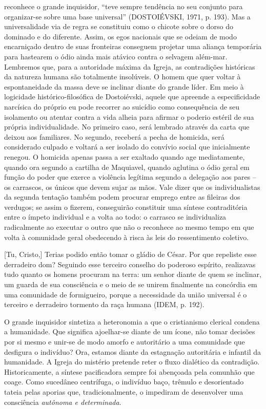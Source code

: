 reconhece o grande inquisidor, ``teve sempre tendência no seu conjunto
para organizar-se sobre uma base universal'' (DOSTOIÉVSKI, 1971, p.
193). Mas a universalidade via de regra se constituiu como o chicote
sobre o dorso do dominado e do diferente. Assim, os egos nacionais que
se odeiam de modo encarniçado dentro de suas fronteiras conseguem
projetar uma aliança temporária para hastearem o ódio ainda mais atávico
contra o selvagem além-mar. Lembremos que, para a autoridade máxima da
Igreja, as contradições históricas da natureza humana são totalmente
insolúveis. O homem que quer voltar à espontaneidade da massa deve se
inclinar diante do grande líder. Em meio à logicidade
histórico-filosófica de Dostoiévski, aquele que apreende a
especificidade narcísica do próprio eu pode recorrer ao suicídio como
consequência de seu isolamento ou atentar contra a vida alheia para
afirmar o poderio estéril de sua própria individualidade. No primeiro
caso, será lembrado através da carta que deixou aos familiares. No
segundo, receberá a pecha de homicida, será considerado culpado e
voltará a ser isolado do convívio social que inicialmente renegou. O
homicida apenas passa a ser exaltado quando age mediatamente, quando ora
segundo a cartilha de Maquiavel, quando aglutina o ódio geral em função
do poder que exerce a violência legítima segundo a delegação aos pares
-- os carrascos, os únicos que devem sujar as mãos. Vale dizer que os
individualistas da segunda tentação também podem procurar emprego entre
as fileiras dos verdugos; se assim o fizerem, conseguirão constituir uma
síntese contraditória entre o ímpeto individual e a volta ao todo: o
carrasco se individualiza radicalmente ao executar o outro que não o
reconhece ao mesmo tempo em que volta à comunidade geral obedecendo à
risca às leis do ressentimento coletivo.

{[}Tu, Cristo,{]} Terias podido então tomar o gládio de César. Por que
repeliste esse derradeiro dom? Seguindo esse terceiro conselho do
poderoso espírito, realizavas tudo quanto os homens procuram na terra:
um senhor diante de quem se inclinar, um guarda de sua consciência e o
meio de se unirem finalmente na concórdia em uma comunidade de
formigueiro, porque a necessidade da união universal é o terceiro e
derradeiro tormento da raça humana (IDEM, p. 192).

O grande inquisidor sintetiza a heteronomia a que o cristianismo
clerical condena a humanidade. Que significa ajoelhar-se diante de um
ícone, não tomar decisões por si mesmo e unir-se de modo amorfo e
autoritário a uma comunidade que desfigura o indivíduo? Ora, estamos
diante da estagnação autoritária e infantil da humanidade. A Igreja do
mistério pretende reter o fluxo dialético da contradição.
Historicamente, a síntese pacificadora sempre foi abençoada pela
comunhão que coage. Como sucedâneo centrífuga, o indivíduo baço, trêmulo
e desorientado tateia pelas aporias que, tradicionalmente, o impediram
de desenvolver uma consciência \emph{autônoma e determinada}.

